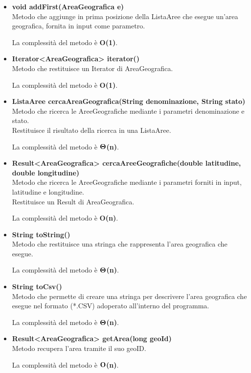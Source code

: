 \documentclass[a4paper, 12pt]{scrreprt}
\begin{document}
\begin{itemize}
				\item \textbf{void addFirst(AreaGeografica e)}
				\\Metodo che aggiunge in prima posizione della ListaAree che esegue un'area geografica, fornita in input come parametro.
				
				La complessit\`a del metodo è \textbf{O(1)}.
				
				\item \textbf{Iterator<AreaGeografica> iterator()}
				\\Metodo che restituisce un Iterator di AreaGeografica.
				
				La complessit\`a del metodo è \textbf{O(1)}.
				
				\item \textbf{ListaAree cercaAreaGeografica(String denominazione, String stato)}
				\\Metodo che ricerca le AreeGeografiche mediante i parametri denominazione e stato.
				\\Restituisce il risultato della ricerca in una ListaAree.
				
				La complessit\`a del metodo \`e $\mathbf{\Theta}$\textbf{(n)}.
				
				\item \textbf{Result<AreaGeografica> cercaAreeGeografiche(double latitudine, double longitudine)}
				\\Metodo che ricerca le AreeGeografiche mediante i parametri forniti in input, latitudine e longitudine.
				\\Restituisce un Result di AreaGeografica.
				
				La complessit\`a del metodo è \textbf{O(n)}.
				
				\item \textbf{String toString()}
				\\Metodo che restituisce una stringa che rappresenta l'area geografica che esegue.
				
				La complessit\`a del metodo \`e $\mathbf{\Theta}$\textbf{(n)}.
				
				\item \textbf{String toCsv()}
				\\Metodo che permette di creare una stringa per descrivere l'area geografica che esegue nel formato (*.CSV) adoperato all'interno del programma.
				
				La complessit\`a del metodo \`e $\mathbf{\Theta}$\textbf{(n)}.
				
				
				\item \textbf{Result<AreaGeografica> getArea(long geoId)}
				\\Metodo recupera l'area tramite il suo geoID.
				
				La complessit\`a del metodo \`e $\mathbf{O}$\textbf{(n)}.
				
			\end{itemize}
\end{document}
